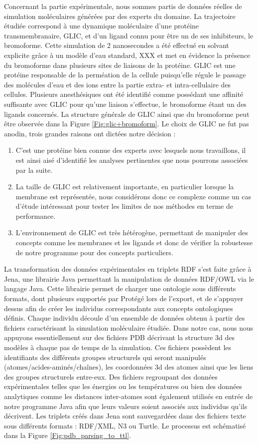 Concernant la partie expérimentale, nous sommes partis de données réelles de simulation moléculaires générées par des experts du domaine. La trajectoire étudiée correspond à une dynamique moléculaire d'une protéine transmembranaire, GLIC, et d'un ligand connu pour être un de ses inhibiteurs, le bromoforme. Cette simulation de 2 nanosecondes a été effectué en solvant explicite grâce à un modèle d'eau standard, XXX et met en évidence la présence du bromoforme dans plusieurs sites de liaisons de la protéine. GLIC est une protéine responsable de la perméation de la cellule puisqu'elle régule le passage des molécules d'eau et des ions entre la partie extra- et intra-cellulaire des cellules. Plusieurs anesthésiques ont été identifié comme possédant une affinité suffisante avec GLIC pour qu'une liaison s'effectue, le bromoforme étant un des ligands concernés. La structure générale de GLIC ainsi que du bromoforme peut être observée dans la Figure \ref{Fig:glic+bromoform}. Le choix de GLIC ne fut pas anodin, trois grandes raisons ont dictées notre décision :
\begin{enumerate}
	\item C'est une protéine bien connue des experts avec lesquels nous travaillons, il est ainsi aisé d'identifié les analyses pertinentes que nous pourrons associées par la suite.
	\item La taille de GLIC est relativement importante, en particulier lorsque la membrane est représentée, nous considérons donc ce complexe comme un cas d'étude intéressant pour tester les limites de nos méthodes en terme de performance.
	\item L'environnement de GLIC est très hétérogène, permettant de manipuler des concepts comme les membranes et les ligands et donc de vérifier la robustesse de notre programme pour des concepts particuliers.
\end{enumerate}

La transformation des données expérimentales en triplets RDF s'est faite grâce à Jena, une librairie Java permettant la manipulation de données RDF/OWL via le langage Java. Cette librairie permet de charger une ontologie sous différents formats, dont plusieurs supportés par Protégé lors de l'export, et de s'appuyer dessus afin de créer les individus correspondants aux concepts ontologiques définis. Chaque individu découle d'un ensemble de données obtenu à partir des fichiers caractérisant la simulation moléculaire étudiée. Dans notre cas, nous nous appuyons essentiellement sur des fichiers PDB décrivant la structure 3d des modèles à chaque pas de temps de la simulation. Ces fichiers possèdent les identifiants des différents groupes structurels qui seront manipulés (atomes/acides-aminés/chaînes), les coordonnées 3d des atomes ainsi que les liens des groupes structurels entre-eux. Des fichiers regroupant des données expérimentales telles que les énergies ou les températures ou bien des données analytiques comme les distances inter-atomes sont également utilisés en entrée de notre programme Java afin que leurs valeurs soient associés aux individus qu'ils décrivent. Les triplets créés dans Jena sont sauvegardées dans des fichiers texte sous différents formats : RDF/XML, N3 ou Turtle. Le processus est schématisé dans la Figure \ref{Fig:pdb_parsing_to_ttl}.


